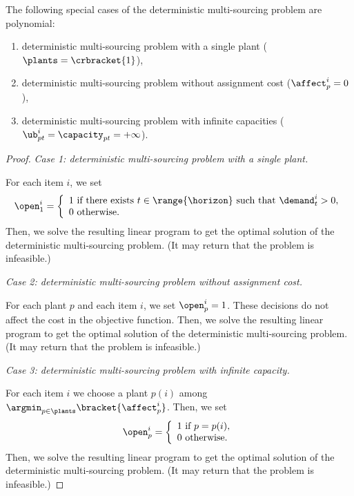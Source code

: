 \begin{prop}\label{prop:deterministic-multi-sourcing:polynomial-cases}
The following special cases of the deterministic multi-sourcing problem are polynomial:
\begin{enumerate}
  \item deterministic multi-sourcing problem with a single plant ($\plants=\crbracket{1}$),
  \item deterministic multi-sourcing problem without assignment cost ($\affect_p^i=0$),
  \item deterministic multi-sourcing problem with infinite capacities ($\ub_{pt}^i=\capacity_{pt}=+\infty$).
\end{enumerate}
\end{prop}


\begin{proof}
\emph{Case 1: deterministic multi-sourcing problem with a single plant.}

For each item $i$, we set
$$
\open_1^i=
\left\{
\begin{array}{l}
1\mbox{ if there exists }t\in\range{\horizon}\mbox{ such that }\demand_t^i>0,\\
0\mbox{ otherwise}.
\end{array}
\right.
$$
Then, we solve the resulting linear program to get the optimal solution of the deterministic multi-sourcing problem.
(It may return that the problem is infeasible.)

\medskip

\emph{Case 2: deterministic multi-sourcing problem without assignment cost.}

For each plant $p$ and each item $i$, we set $\open_p^i=1$.
These decisions do not affect the cost in the objective function.
Then, we solve the resulting linear program to get the optimal solution of the deterministic multi-sourcing problem.
(It may return that the problem is infeasible.)

\medskip

\emph{Case 3: deterministic multi-sourcing problem with infinite capacity.}

For each item $i$ we choose a plant $p(i)$ among $\argmin_{p\in\plants}\bracket{\affect_p^i}$.
Then, we set
$$
\open_p^i=
\left\{
\begin{array}{l}
1\mbox{ if }p=p(i),\\
0\mbox{ otherwise}.
\end{array}
\right.
$$
Then, we solve the resulting linear program to get the optimal solution of the deterministic multi-sourcing problem.
(It may return that the problem is infeasible.)
\end{proof}







